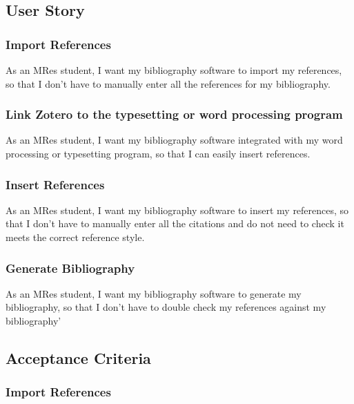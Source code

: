 \documentclass{article}
\begin{document}
\subsection*{User Story}

\subsubsection*{Import References}

As an MRes student, I want my bibliography software to import my references, so that I don’t have to manually enter all the references for my bibliography.

\subsubsection*{Link Zotero to the typesetting or word processing program}

As an MRes student, I want my bibliography software integrated with my word processing or typesetting program, so that I can easily insert references.

\subsubsection*{Insert References}

As an MRes student, I want my bibliography software to insert my references, so that I don’t have to manually enter all the citations and do not need to check it meets the correct reference style.

\subsubsection*{Generate Bibliography}

As an MRes student, I want my bibliography software to generate my bibliography, so that I don’t have to double check my references against my bibliography’

\subsection*{Acceptance Criteria}

\subsubsection*{Import References}
\end{document}
